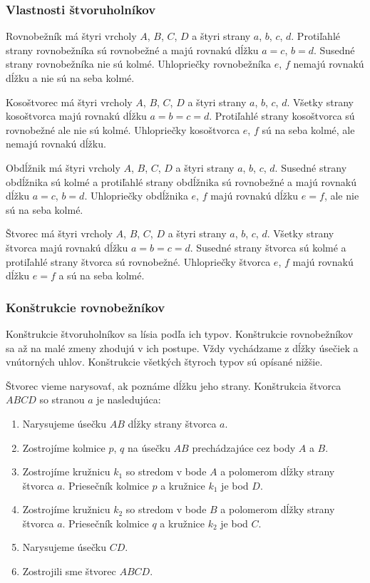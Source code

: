 \documentclass{report}
\begin{document}
\subsubsection{Vlastnosti štvoruholníkov}

Rovnobežník má štyri vrcholy \(A\), \(B\), \(C\), \(D\) a štyri strany \(a\), \(b\), \(c\), \(d\). Protiľahlé strany rovnobežníka sú rovnobežné a majú rovnakú dĺžku \(a = c\), \(b = d\). Susedné strany rovnobežníka nie sú kolmé. Uhlopriečky rovnobežníka \(e\), \(f\) nemajú rovnakú dĺžku a nie sú na seba kolmé.

Kosoštvorec má štyri vrcholy \(A\), \(B\), \(C\), \(D\) a štyri strany \(a\), \(b\), \(c\), \(d\). Všetky strany kosoštvorca majú rovnakú dĺžku \(a = b = c = d\). Protiľahlé strany kosoštvorca sú rovnobežné ale nie sú kolmé. Uhlopriečky kosoštvorca \(e\), \(f\) sú na seba kolmé, ale nemajú rovnakú dĺžku.

Obdĺžnik má štyri vrcholy \(A\), \(B\), \(C\), \(D\) a štyri strany \(a\), \(b\), \(c\), \(d\). Susedné strany obdĺžnika sú kolmé a protiľahlé strany obdĺžnika sú rovnobežné a majú rovnakú dĺžku \(a = c\), \(b = d\). Uhlopriečky obdĺžnika \(e\), \(f\) majú rovnakú dĺžku \(e = f\), ale nie sú na seba kolmé.

Štvorec má štyri vrcholy \(A\), \(B\), \(C\), \(D\) a štyri strany \(a\), \(b\), \(c\), \(d\). Všetky strany štvorca majú rovnakú dĺžku \(a = b = c = d\). Susedné strany štvorca sú kolmé a protiľahlé strany štvorca sú rovnobežné. Uhlopriečky štvorca \(e\), \(f\) majú rovnakú dĺžku \(e = f\) a sú na seba kolmé.

\subsubsection{Konštrukcie rovnobežníkov}

Konštrukcie štvoruholníkov sa lísia podľa ich typov. Konštrukcie rovnobežníkov sa až na malé zmeny zhodujú v ich postupe. Vždy vychádzame z dĺžky úsečiek a vnútorných uhlov. Konštrukcie všetkých štyroch typov sú opísané nižšie.

Štvorec vieme narysovať, ak poznáme dĺžku jeho strany. Konštrukcia štvorca \(ABCD\) so stranou \(a\) je nasledujúca:
\begin{enumerate}[label=\arabic*)]
  \item Narysujeme úsečku \(AB\) dĺžky strany štvorca \(a\).
  \item Zostrojíme kolmice \(p\), \(q\) na úsečku \(AB\) prechádzajúce cez body \(A\) a \(B\).
  \item Zostrojíme kružnicu \(k_1\) so stredom v bode \(A\) a polomerom dĺžky strany štvorca \(a\). Priesečník kolmice \(p\) a kružnice \(k_1\) je bod \(D\).
  \item Zostrojíme kružnicu \(k_2\) so stredom v bode \(B\) a polomerom dĺžky strany štvorca \(a\). Priesečník kolmice \(q\) a kružnice \(k_2\) je bod \(C\).
  \item Narysujeme úsečku \(CD\).
  \item Zostrojili sme štvorec \(ABCD\).
\end{enumerate}
\end{document}
